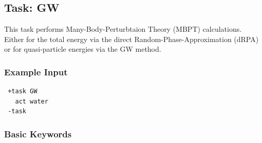 \documentclass[bibliography=totocnumbered,a4paper,10pt,oneside]{scrbook}
\begin{document}
\subsection{Task: GW}
This task performs Many-Body-Perturbtaion Theory (MBPT) calculations. Either for the total energy via the direct Random-Phase-Approximation (dRPA) or for quasi-particle energies via the GW method. 
\subsubsection{Example Input}
\begin{lstlisting}
 +task GW
   act water
 -task
\end{lstlisting}
\subsubsection{Basic Keywords}
\end{document}
